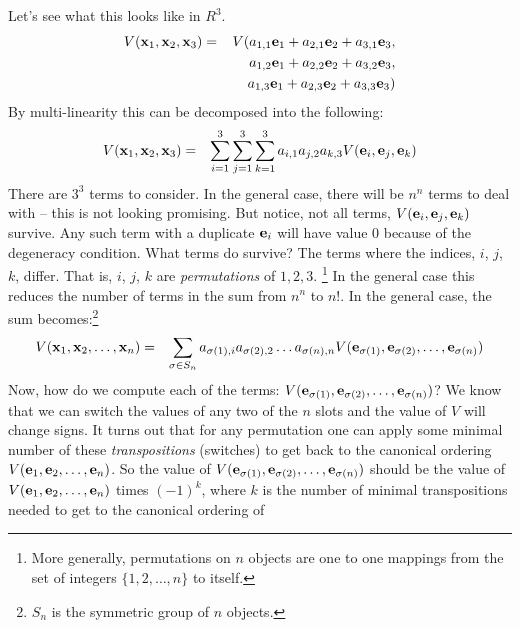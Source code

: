 \documentclass{article}
\begin{document}
Let's see what this looks like in $R^3$.
\begin{eqnarray}
  V({\bf x}_1, {\bf x}_2, {\bf x}_3)
  & = & V(a_{1,1} {\bf e}_1 + a_{2,1} {\bf e}_2 + a_{3,1} {\bf e}_3, \nonumber \\
  & & \hphantom{V(}a_{1,2} {\bf e}_1 + a_{2,2} {\bf e}_2 + a_{3,2} {\bf e}_3, \nonumber \\
  & & \hphantom{V(}a_{1,3} {\bf e}_1 + a_{2,3} {\bf e}_2 + a_{3,3} {\bf e}_3)
\end{eqnarray}
By multi-linearity this can be decomposed into the following:
\begin{eqnarray}
  V({\bf x}_1, {\bf x}_2, {\bf x}_3)
  & = & \sum_{i=1}^3\sum_{j=1}^3 \sum_{k=1}^3 a_{i,1} a_{j,2} a_{k,3}
        V({\bf e}_{i}, {\bf e}_{j}, {\bf e}_{k})
\end{eqnarray}
There are $3^3$ terms to consider. In the general case, there will be $n^n$ terms to
deal with -- this is not looking promising. But notice, not all terms,
$V({\bf e}_{i}, {\bf e}_{j}, {\bf e}_{k})$ survive. Any such term with
a duplicate ${\bf e}_i$ will have value $0$ because of the degeneracy condition.
What terms do survive? The terms
where the indices, $i$, $j$, $k$, differ. That is, $i$, $j$, $k$ are
{\em permutations\/}
of $1, 2, 3$.%
\footnote{More generally, permutations on $n$ objects are one to one
  mappings from the set of integers $\{1, 2, \ldots, n\}$ to itself.}
In the general case this reduces
the number of terms in the sum from $n^n$ to $n!$. In the general case, the
sum becomes:\footnote{$S_n$ is the symmetric group of $n$ objects.}
\begin{eqnarray}
  V({\bf x}_1, {\bf x}_2, \ldots, {\bf x}_n)
  & = & \sum_{\sigma \in S_n} a_{\sigma(1), i} a_{\sigma(2),2} \ldots a_{\sigma(n), n}
        V({\bf e}_{\sigma(1)}, {\bf e}_{\sigma(2)}, \ldots, {\bf e}_{\sigma(n)})
\end{eqnarray}
Now, how do we compute each of the terms:
$V({\bf e}_{\sigma(1)}, {\bf e}_{\sigma(2)}, \ldots, {\bf e}_{\sigma(n)})$?
We know that we can switch the values of any two of the $n$ slots and the
value of $V$ will change signs. It turns out that for any permutation one can
apply some minimal number of these {\em transpositions\/} (switches)
to get back to the canonical
ordering $V({\bf e}_1, {\bf e}_2, \ldots, {\bf e}_n)$. So the value of
$V({\bf e}_{\sigma(1)}, {\bf e}_{\sigma(2)}, \ldots, {\bf e}_{\sigma(n)})$ should be
the value of $V({\bf e}_1, {\bf e}_2, \ldots, {\bf e}_n)$ times $(-1)^k$, where
$k$ is the number of minimal transpositions needed to get to the canonical ordering of
\end{document}
